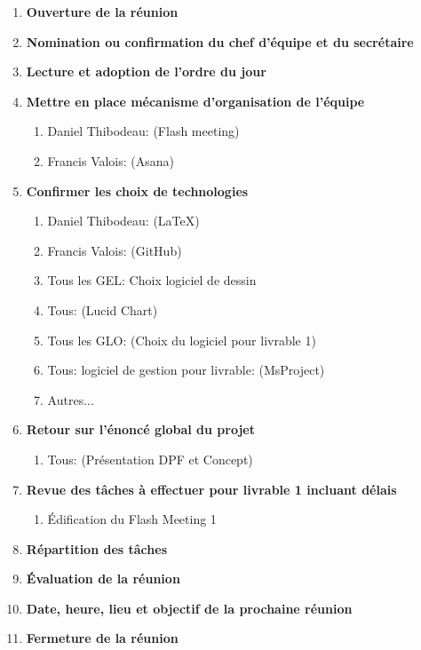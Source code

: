 \documentclass[12pt]{ULojpv}
\begin{document}
\entete
\begin{enumerate}
   \item \textbf{Ouverture de la réunion}
   \item \textbf{Nomination ou confirmation du chef d'équipe et du secrétaire}
   \item \textbf{Lecture et adoption de l'ordre du jour}
   \item \textbf{Mettre en place mécanisme d'organisation de l'équipe}
      \begin{enumerate}
         \item Daniel Thibodeau: (Flash meeting)
         \item Francis Valois: (Asana)
      \end{enumerate}
   \item \textbf{Confirmer les choix de technologies}
      \begin{enumerate}
         \item Daniel Thibodeau: (LaTeX)
         \item Francis Valois: (GitHub)
         \item Tous les GEL: Choix logiciel de dessin
         \item Tous: (Lucid Chart)
         \item Tous les GLO: (Choix du logiciel pour livrable 1)
         \item Tous: logiciel de gestion pour livrable: (MsProject)
         \item Autres...
      \end{enumerate}
   \item \textbf{Retour sur l'énoncé global du projet}
   \begin{enumerate}
         \item Tous: (Présentation DPF et Concept)
      \end{enumerate}
   \item \textbf{Revue des tâches à effectuer pour livrable 1 incluant délais}
   \begin{enumerate}
   		 \item  Édification du Flash Meeting 1
   \end{enumerate}
   \item \textbf{Répartition des tâches}
   \item \textbf{Évaluation de la réunion}
   \item \textbf{Date, heure, lieu et objectif de la prochaine réunion}
   \item \textbf{Fermeture de la réunion}
\end{enumerate}
\end{document}
